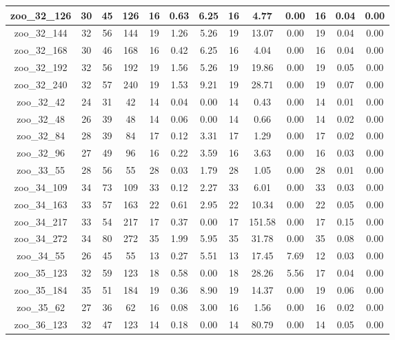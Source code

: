 \begin{landscape}
\begin{longtable}{|c|c|c|c|c|c|c|c|c|c|c|c|c|}
zoo\_32\_126 & 30 & 45 & 126 & 16 & 0.63 & 6.25 & 16 & 4.77 & 0.00 & 16 & 0.04 & 0.00 \\ \hline 
zoo\_32\_144 & 32 & 56 & 144 & 19 & 1.26 & 5.26 & 19 & 13.07 & 0.00 & 19 & 0.04 & 0.00 \\ \hline 
zoo\_32\_168 & 30 & 46 & 168 & 16 & 0.42 & 6.25 & 16 & 4.04 & 0.00 & 16 & 0.04 & 0.00 \\ \hline 
zoo\_32\_192 & 32 & 56 & 192 & 19 & 1.56 & 5.26 & 19 & 19.86 & 0.00 & 19 & 0.05 & 0.00 \\ \hline 
zoo\_32\_240 & 32 & 57 & 240 & 19 & 1.53 & 9.21 & 19 & 28.71 & 0.00 & 19 & 0.07 & 0.00 \\ \hline 
zoo\_32\_42 & 24 & 31 & 42 & 14 & 0.04 & 0.00 & 14 & 0.43 & 0.00 & 14 & 0.01 & 0.00 \\ \hline 
zoo\_32\_48 & 26 & 39 & 48 & 14 & 0.06 & 0.00 & 14 & 0.66 & 0.00 & 14 & 0.02 & 0.00 \\ \hline 
zoo\_32\_84 & 28 & 39 & 84 & 17 & 0.12 & 3.31 & 17 & 1.29 & 0.00 & 17 & 0.02 & 0.00 \\ \hline 
zoo\_32\_96 & 27 & 49 & 96 & 16 & 0.22 & 3.59 & 16 & 3.63 & 0.00 & 16 & 0.03 & 0.00 \\ \hline 
zoo\_33\_55 & 28 & 56 & 55 & 28 & 0.03 & 1.79 & 28 & 1.05 & 0.00 & 28 & 0.01 & 0.00 \\ \hline 
zoo\_34\_109 & 34 & 73 & 109 & 33 & 0.12 & 2.27 & 33 & 6.01 & 0.00 & 33 & 0.03 & 0.00 \\ \hline 
zoo\_34\_163 & 33 & 57 & 163 & 22 & 0.61 & 2.95 & 22 & 10.34 & 0.00 & 22 & 0.05 & 0.00 \\ \hline 
zoo\_34\_217 & 33 & 54 & 217 & 17 & 0.37 & 0.00 & 17 & 151.58 & 0.00 & 17 & 0.15 & 0.00 \\ \hline 
zoo\_34\_272 & 34 & 80 & 272 & 35 & 1.99 & 5.95 & 35 & 31.78 & 0.00 & 35 & 0.08 & 0.00 \\ \hline 
zoo\_34\_55 & 26 & 45 & 55 & 13 & 0.27 & 5.51 & 13 & 17.45 & 7.69 & 12 & 0.03 & 0.00 \\ \hline 
zoo\_35\_123 & 32 & 59 & 123 & 18 & 0.58 & 0.00 & 18 & 28.26 & 5.56 & 17 & 0.04 & 0.00 \\ \hline 
zoo\_35\_184 & 35 & 51 & 184 & 19 & 0.36 & 8.90 & 19 & 14.37 & 0.00 & 19 & 0.06 & 0.00 \\ \hline 
zoo\_35\_62 & 27 & 36 & 62 & 16 & 0.08 & 3.00 & 16 & 1.56 & 0.00 & 16 & 0.02 & 0.00 \\ \hline 
zoo\_36\_123 & 32 & 47 & 123 & 14 & 0.18 & 0.00 & 14 & 80.79 & 0.00 & 14 & 0.05 & 0.00 \\ \hline 

\end{longtable}
\end{landscape}
